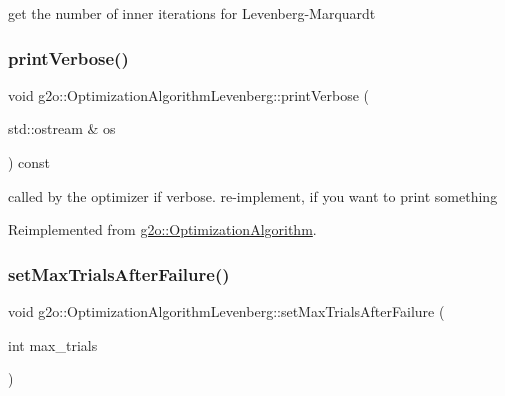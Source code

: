 get the number of inner iterations for Levenberg-\/\+Marquardt 

\mbox{\label{classg2o_1_1_optimization_algorithm_levenberg_a67308ead9762f478e29385229ea4b138}} 
\subsubsection{\texorpdfstring{print\+Verbose()}{printVerbose()}}
{\footnotesize\ttfamily void g2o\+::\+Optimization\+Algorithm\+Levenberg\+::print\+Verbose (\begin{DoxyParamCaption}\item[{std\+::ostream \&}]{os }\end{DoxyParamCaption}) const\hspace{0.3cm}{\ttfamily [virtual]}}

called by the optimizer if verbose. re-\/implement, if you want to print something 

Reimplemented from \mbox{\hyperlink{classg2o_1_1_optimization_algorithm_a6683d35e67402b50924bc4744b6e282a}{g2o\+::\+Optimization\+Algorithm}}.

\mbox{\label{classg2o_1_1_optimization_algorithm_levenberg_a0fd2212e456428e44ddac693f6d27ac8}} 
\subsubsection{\texorpdfstring{set\+Max\+Trials\+After\+Failure()}{setMaxTrialsAfterFailure()}}
{\footnotesize\ttfamily void g2o\+::\+Optimization\+Algorithm\+Levenberg\+::set\+Max\+Trials\+After\+Failure (\begin{DoxyParamCaption}\item[{int}]{max\+\_\+trials }\end{DoxyParamCaption})}



